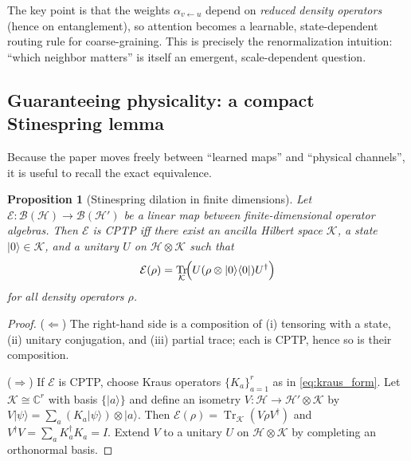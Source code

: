 \documentclass[11pt,oneside]{amsbook}
\numberwithin{equation}{section}
\theoremstyle{plain}
\newtheorem{proposition}[theorem]{Proposition}
\theoremstyle{definition}
\theoremstyle{remark}
\DeclareMathOperator{\Tr}{\mathrm{Tr}}
\newcommand{\ket}[1]{\lvert #1 \rangle}
\newcommand{\bra}[1]{\langle #1 \rvert}
\begin{document}
The key point is that the weights $\alpha_{v\leftarrow u}$ depend on \emph{reduced density operators} (hence on entanglement), so attention becomes a learnable, state-dependent routing rule for coarse-graining.
This is precisely the renormalization intuition: ``which neighbor matters'' is itself an emergent, scale-dependent question.

\subsection{Guaranteeing physicality: a compact Stinespring lemma}
Because the paper moves freely between ``learned maps'' and ``physical channels'', it is useful to recall the exact equivalence.

\begin{proposition}[Stinespring dilation in finite dimensions]
\label{prop:stinespring_finite}
Let $\mathcal{E}:\mathcal{B}(\mathcal{H})\to\mathcal{B}(\mathcal{H}')$ be a linear map between finite-dimensional operator algebras.
Then $\mathcal{E}$ is CPTP iff there exist an ancilla Hilbert space $\mathcal{K}$, a state $\ket{0}\in\mathcal{K}$, and a unitary $U$ on $\mathcal{H}\otimes\mathcal{K}$ such that
\[
\mathcal{E}(\rho)=\Tr_{\mathcal{K}}\!\Bigl(U(\rho\otimes\ket{0}\bra{0})U^\dagger\Bigr)
\]
for all density operators $\rho$.
\end{proposition}

\begin{proof}
($\Leftarrow$) The right-hand side is a composition of (i) tensoring with a state, (ii) unitary conjugation, and (iii) partial trace; each is CPTP, hence so is their composition.

($\Rightarrow$) If $\mathcal{E}$ is CPTP, choose Kraus operators $\{K_a\}_{a=1}^r$ as in \eqref{eq:kraus_form}.
Let $\mathcal{K}\cong\mathbb{C}^r$ with basis $\{\ket{a}\}$ and define an isometry $V:\mathcal{H}\to\mathcal{H}'\otimes\mathcal{K}$ by
$V\ket{\psi}=\sum_a (K_a\ket{\psi})\otimes\ket{a}$.
Then $\mathcal{E}(\rho)=\Tr_{\mathcal{K}}(V\rho V^\dagger)$ and $V^\dagger V=\sum_a K_a^\dagger K_a=I$.
Extend $V$ to a unitary $U$ on $\mathcal{H}\otimes\mathcal{K}$ by completing an orthonormal basis.
\end{proof}
\end{document}
